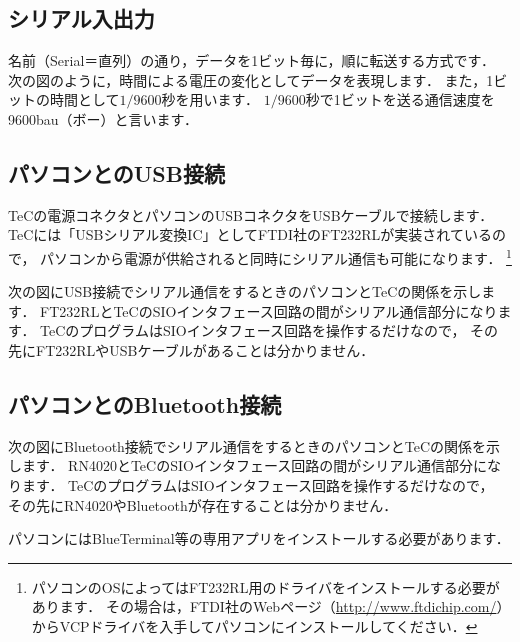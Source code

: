 \subsection{シリアル入出力}
名前（Serial＝直列）の通り，データを1ビット毎に，順に転送する方式です．
次の図のように，時間による電圧の変化としてデータを表現します．
また，1ビットの時間として$1/9600$秒を用います．
$1/9600$秒で1ビットを送る通信速度を9600bau（ボー）と言います．

\begin{center}
\end{center}

\subsection{パソコンとのUSB接続}
TeCの電源コネクタとパソコンのUSBコネクタをUSBケーブルで接続します．
TeCには「USBシリアル変換IC」としてFTDI社のFT232RLが実装されているので，
パソコンから電源が供給されると同時にシリアル通信も可能になります．
\footnote{パソコンのOSによってはFT232RL用のドライバをインストールする必要があります．
  その場合は，FTDI社のWebページ（\url{http://www.ftdichip.com/}）
  からVCPドライバを入手してパソコンにインストールしてください．}

次の図にUSB接続でシリアル通信をするときのパソコンとTeCの関係を示します．
FT232RLとTeCのSIOインタフェース回路の間がシリアル通信部分になります．
TeCのプログラムはSIOインタフェース回路を操作するだけなので，
その先にFT232RLやUSBケーブルがあることは分かりません．

\begin{center}
\end{center}

\subsection{パソコンとのBluetooth接続}
次の図にBluetooth接続でシリアル通信をするときのパソコンとTeCの関係を示します．
RN4020とTeCのSIOインタフェース回路の間がシリアル通信部分になります．
TeCのプログラムはSIOインタフェース回路を操作するだけなので，
その先にRN4020やBluetoothが存在することは分かりません．

パソコンにはBlueTerminal等の専用アプリをインストールする必要があります．

